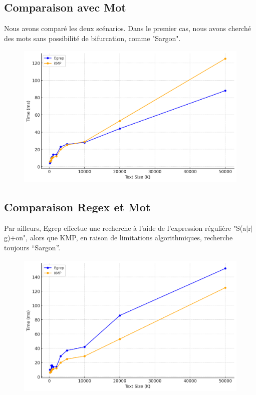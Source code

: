 \documentclass[11pt,english]{article}
\begin{document}
\subsection{Comparaison avec Mot}

\indent

Nous avons comparé les deux scénarios.
Dans le premier cas, nous avons cherché des mots sans possibilité de bifurcation, comme "Sargon".

\begin{figure}[htbp]
    \begin{center}
        \includegraphics[height=7cm]{./src/Compare1.png}
    \end{center}
\end{figure}

\pagebreak

\subsection{Comparaison Regex et Mot}

\indent 

Par ailleurs, Egrep effectue une recherche à l'aide de l'expression régulière "S(a$|$r$|$g)+on", alors que KMP, en raison de limitations algorithmiques, recherche toujours “Sargon”.

\begin{figure}[htbp]
    \begin{center}
        \includegraphics[height=7cm]{./src/Compare2.png}
    \end{center}
\end{figure}
\end{document}
